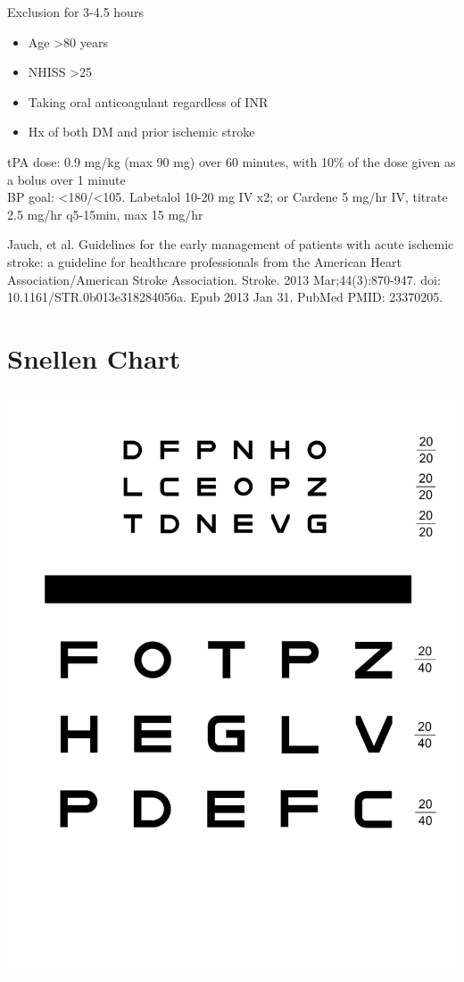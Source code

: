 \documentclass[8pt]{extarticle}
\begin{document}
Exclusion for 3-4.5 hours
\begin{itemize}
    \item Age >80 years
    \item NHISS >25
    \item Taking oral anticoagulant regardless of INR
    \item Hx of both DM and prior ischemic stroke
\end{itemize}
tPA dose: 0.9 mg/kg (max 90 mg) over 60 minutes, with 10\% of the dose given as a bolus over 1 minute\\
BP goal: <180/<105. Labetalol 10-20 mg IV x2; or Cardene 5 mg/hr IV, titrate 2.5 mg/hr q5-15min, max 15 mg/hr

\vfill

\tiny{Jauch, et al. Guidelines for the early management of patients with acute ischemic stroke: a guideline for healthcare professionals from the American Heart Association/American Stroke Association. Stroke. 2013 Mar;44(3):870-947. doi: 10.1161/STR.0b013e318284056a. Epub 2013 Jan 31. PubMed PMID: 23370205.}
\newpage
\section{Snellen Chart}

\includegraphics[width=\textwidth]{eyechart.png}
\end{document}
